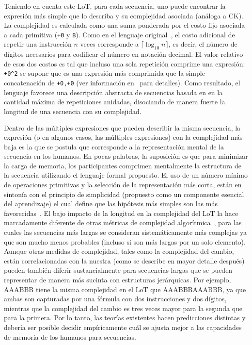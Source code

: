 Teniendo en cuenta este LoT, para cada secuencia, uno puede encontrar la expresión más simple que lo describa y su complejidad asociada (análoga a CK). La complejidad es calculada como una suma ponderada por el costo fijo asociada a cada primitiva (\verb#+0# y \verb#B#). Como en el lenguaje original~\cite{amalric2017language}, el costo adicional de repetir una instrucción $n$ veces corresponde a $\lceil \log_{10} n \rceil$, es decir, el número de dígitos necesarios para codificar el número en notación decimal. El valor relativo de esos dos costos es tal que incluso una sola repetición comprime una expresión: \verb#+0^2# se supone que es una expresión más comprimida que la simple concatenación de \verb#+0,+0# (ver información en~\cite{amalric2017language} para detalles). Como resultado, el lenguaje favorece una descripción abstracta de secuencias basada en en la cantidad máxima de repeticiones anidadas, disociando de manera fuerte la longitud de una secuencia con su complejidad.
\color{black}

Dentro de las múltiples expresiones que pueden describir la misma secuencia, la expresión (o en algunos casos, las múltiples expresiones) con la complejidad más baja es la que se postula que corresponde a la representación mental de la secuencia en los humanos. En pocas palabras, la suposición es que para minimizar la carga de memoria, los participantes comprimen mentalmente la estructura de la secuencia utilizando el lenguaje formal propuesto. El uso de un número mínimo de operaciones primitivas y la selección de la representación más corta, están en sintonía con el principio de simplicidad (propuesto como un componente esencial del aprendizaje) el cual define que las hipótesis más simples son las más favorecidas~\cite{f32,feldman2003simplicity}. El bajo impacto de la longitud en la complejidad del LoT la hace marcadamente diferente de otras métricas de complejidad algorítmica~\cite{f43,f44,f46}, para las cuales las secuencias más largas se consideran sistemáticamente más complejas ya que son mucho menos probables (incluso si son más largas por un solo elemento). Aunque otras medidas de complejidad, tales como la complejidad del cambio, están correlacionadas con la nuestra (como se describe en mayor detalle después) pueden también diferir sustancialmente para secuencias largas que se pueden representar de manera más sucinta con estructuras jerárquicas. Por ejemplo, AAABBB tiene la misma complejidad en el LoT que AAABBBAAABBB, ya que ambas son capturadas por una fórmula con dos instrucciones y dos dígitos, mientras que la complejidad del cambio es tres veces mayor para la segunda que para la primera. Por lo tanto, las teorías existentes hacen predicciones distintas y debería ser posible decidir empíricamente cuál se ajusta mejor a las capacidades de memoria de los humanos para secuencias. 


